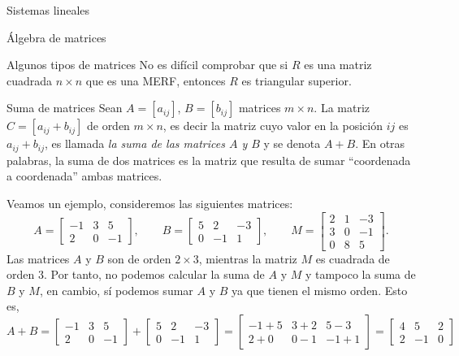 \documentclass[a4paper,12pt,twoside,spanish,reqno]{amsbook}
\theoremstyle{definition}
\theoremstyle{remark}
\begin{document}
\begin{chapter}{Sistemas lineales}
\begin{section}{Álgebra de matrices}
\begin{subsection}{Algunos tipos de matrices}
				No es difícil comprobar que si $R$ es una matriz cuadrada $n \times n$  que es una MERF,  entonces $R$  es triangular superior. 
				
			 
			\end{subsection}
			
			
			\begin{subsection}{Suma  de matrices}
				Sean $A=[a_{ij}]$, $B=[b_{ij}]$ matrices  $m \times n$. La matriz $C= [a_{ij} + b_{ij}]$ de orden $m \times n$,  es decir la matriz cuyo valor en la posición $ij$ es  $a_{ij} + b_{ij}$, es llamada \textit{la suma de las matrices $A$ y $B$} y se denota $A+B$. En otras palabras, la suma de dos matrices es la matriz que resulta de sumar ``coordenada a coordenada'' ambas matrices. 
				
				Veamos un ejemplo, consideremos las siguientes matrices:
				\begin{equation*}
				A = \begin{bmatrix} -1&3&5 \\ 2&0&-1  \end{bmatrix}, \qquad
				B = \begin{bmatrix} 5&2&-3 \\ 0&-1&1  \end{bmatrix}, \qquad
				M = \begin{bmatrix} 2&1&-3 \\ 3&0&-1 \\ 0&8&5 \end{bmatrix}.
				\end{equation*}
				Las matrices $A$ y $B$ son de orden $2 \times 3$, mientras la matriz $M$ es cuadrada de orden 3. Por tanto, no podemos calcular la suma de $A$ y $M$ y tampoco la suma de $B$ y $M$, en cambio, sí podemos sumar $A$ y $B$ ya que tienen el mismo orden. Esto es,
				\begin{equation*}
				A + B = \begin{bmatrix} -1&3&5 \\ 2&0&-1  \end{bmatrix}+
				\begin{bmatrix} 5&2&-3 \\ 0&-1&1  \end{bmatrix} =
				\begin{bmatrix} -1+5&3+2&5-3 \\ 2+0&0-1&-1+1  \end{bmatrix}=
				\begin{bmatrix} 4&5&2 \\ 2&-1&0  \end{bmatrix}
				\end{equation*}
				

\end{subsection}
\end{section}
\end{chapter}
\end{document}
